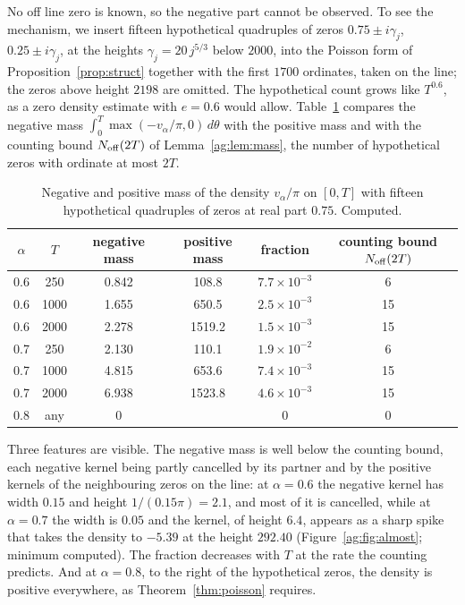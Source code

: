 No off line zero is known, so the negative part cannot be observed. To see the mechanism, we insert fifteen hypothetical quadruples of zeros $0.75\pm i\gamma_j$, $0.25\pm i\gamma_j$, at the heights $\gamma_j=20\,j^{5/3}$ below $2000$, into the Poisson form of Proposition~\ref{prop:struct} together with the first $1700$ ordinates, taken on the line; the zeros above height $2198$ are omitted. The hypothetical count grows like $T^{0.6}$, as a zero density estimate with $e=0.6$ would allow. Table~\ref{ag:tab:syn} compares the negative mass $\int_0^T\max(-v_\alpha/\pi,0)\,d\theta$ with the positive mass and with the counting bound $N_{\rm off}(2T)$ of Lemma~\ref{ag:lem:mass}, the number of hypothetical zeros with ordinate at most $2T$.

\begin{table}[htbp]
\centering\small
\begin{tabular}{cccccc}
\toprule
$\alpha$ & $T$ & negative mass & positive mass & fraction & counting bound $N_{\rm off}(2T)$\\
\midrule
0.6 & 250 & 0.842 & 108.8 & $7.7\times10^{-3}$ & 6\\
0.6 & 1000 & 1.655 & 650.5 & $2.5\times10^{-3}$ & 15\\
0.6 & 2000 & 2.278 & 1519.2 & $1.5\times10^{-3}$ & 15\\
0.7 & 250 & 2.130 & 110.1 & $1.9\times10^{-2}$ & 6\\
0.7 & 1000 & 4.815 & 653.6 & $7.4\times10^{-3}$ & 15\\
0.7 & 2000 & 6.938 & 1523.8 & $4.6\times10^{-3}$ & 15\\
0.8 & any & 0 & & 0 & 0\\
\bottomrule
\end{tabular}
\caption{Negative and positive mass of the density $v_\alpha/\pi$ on $[0,T]$ with fifteen hypothetical quadruples of zeros at real part $0.75$. Computed.}
\label{ag:tab:syn}
\end{table}

Three features are visible. The negative mass is well below the counting bound, each negative kernel being partly cancelled by its partner and by the positive kernels of the neighbouring zeros on the line: at $\alpha=0.6$ the negative kernel has width $0.15$ and height $1/(0.15\pi)=2.1$, and most of it is cancelled, while at $\alpha=0.7$ the width is $0.05$ and the kernel, of height $6.4$, appears as a sharp spike that takes the density to $-5.39$ at the height $292.40$ (Figure~\ref{ag:fig:almost}; minimum computed). The fraction decreases with $T$ at the rate the counting predicts. And at $\alpha=0.8$, to the right of the hypothetical zeros, the density is positive everywhere, as Theorem~\ref{thm:poisson} requires.

